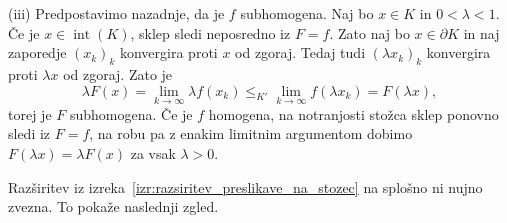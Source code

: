 \documentclass[mat2, tisk]{fmfdelo}
\begin{document}
\begin{dokaz}
(iii) Predpostavimo nazadnje, da je $f$ subhomogena.
Naj bo $x\in K$ in $0<\lambda<1$.
Če je $x\in\operatorname{int}(K)$, sklep sledi
neposredno iz $F=f$.
Zato naj bo $x\in\partial K$ in naj zaporedje
$(x_k)_k$ konvergira proti $x$ od zgoraj.
Tedaj tudi $(\lambda x_k)_k$ konvergira
proti $\lambda x$ od zgoraj. Zato je
\begin{equation*}
\lambda F(x)
=
\lim_{k\to\infty}\lambda f(x_k)
\leq_{K'}
\lim_{k\to\infty}f(\lambda x_k)
=
F(\lambda x),
\end{equation*}
torej je $F$ subhomogena. Če je $f$ homogena, na notranjosti stožca
sklep ponovno sledi iz $F=f$, na robu pa
z enakim limitnim argumentom dobimo
$F(\lambda x)=\lambda F(x)$ za vsak $\lambda>0$.
\end{dokaz}

Razširitev iz izreka~\ref{izr:razsiritev_preslikave_na_stozec} na
splošno ni nujno zvezna. To pokaže naslednji zgled.
\end{document}
